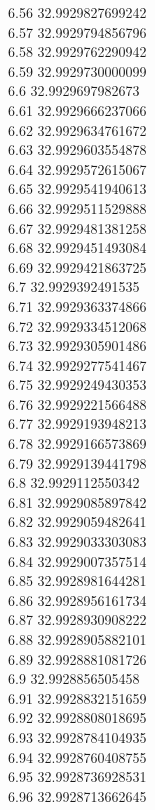 {6.56	32.9929827699242\\
6.57	32.9929794856796\\
6.58	32.9929762290942\\
6.59	32.9929730000099\\
6.6	32.9929697982673\\
6.61	32.9929666237066\\
6.62	32.9929634761672\\
6.63	32.9929603554878\\
6.64	32.9929572615067\\
6.65	32.9929541940613\\
6.66	32.9929511529888\\
6.67	32.9929481381258\\
6.68	32.9929451493084\\
6.69	32.9929421863725\\
6.7	32.9929392491535\\
6.71	32.9929363374866\\
6.72	32.9929334512068\\
6.73	32.9929305901486\\
6.74	32.9929277541467\\
6.75	32.9929249430353\\
6.76	32.9929221566488\\
6.77	32.9929193948213\\
6.78	32.9929166573869\\
6.79	32.9929139441798\\
6.8	32.9929112550342\\
6.81	32.9929085897842\\
6.82	32.9929059482641\\
6.83	32.9929033303083\\
6.84	32.9929007357514\\
6.85	32.9928981644281\\
6.86	32.9928956161734\\
6.87	32.9928930908222\\
6.88	32.9928905882101\\
6.89	32.9928881081726\\
6.9	32.9928856505458\\
6.91	32.9928832151659\\
6.92	32.9928808018695\\
6.93	32.9928784104935\\
6.94	32.9928760408755\\
6.95	32.9928736928531\\
6.96	32.9928713662645\\
}
